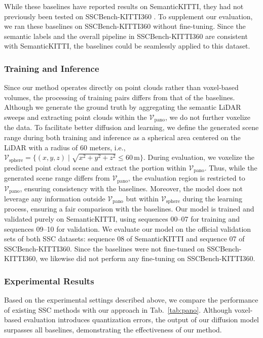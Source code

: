 \documentclass[conference]{IEEEtran}
\begin{document}
While these baselines have reported results on SemanticKITTI, they had not previously been tested on SSCBench-KITTI360 \cite{vzyrianov2024}.
To supplement our evaluation, we ran these baselines on SSCBench-KITTI360 without fine-tuning.
Since the semantic labels and the overall pipeline in SSCBench-KITTI360 are consistent with SemanticKITTI, the baselines could be seamlessly applied to this dataset.

\subsubsection{Training and Inference}

Since our method operates directly on point clouds rather than voxel-based volumes, the processing of training pairs differs from that of the baselines.
Although we generate the ground truth by aggregating the semantic LiDAR sweeps and extracting point clouds within the $\mathcal{V}_\mathrm{pano}$, we do not further voxelize the data.
To facilitate better diffusion and learning, we define the generated scene range during both training and inference as a spherical area centered on the LiDAR with a radius of 60 meters, i.e.,
$\mathcal{V}_\mathrm{sphere} = \{(x,y,z) \mid \sqrt{x^2+y^2+z^2} \leq 60\,\text{m}\}$.
During evaluation, we voxelize the predicted point cloud scene and extract the portion within $\mathcal{V}_\mathrm{pano}$.
Thus, while the generated scene range differs from $\mathcal{V}_\mathrm{pano}$, the evaluation region is restricted to $\mathcal{V}_\mathrm{pano}$, ensuring consistency with the baselines.
Moreover, the model does not leverage any information outside $\mathcal{V}_\mathrm{pano}$ but within $\mathcal{V}_\mathrm{sphere}$ during the learning process, ensuring a fair comparison with the baselines.
Our model is trained and validated purely on SemanticKITTI, using sequences 00--07 for training and sequences 09--10 for validation.
We evaluate our model on the official validation sets of both SSC datasets: sequence 08 of SemanticKITTI and sequence 07 of SSCBench-KITTI360.
Since the baselines were not fine-tuned on SSCBench-KITTI360, we likewise did not perform any fine-tuning on SSCBench-KITTI360.

\subsubsection{Experimental Results}

Based on the experimental settings described above, we compare the performance of existing SSC methods with our approach in Tab.~\ref{tab:pano}.
Although voxel-based evaluation introduces quantization errors, the output of our diffusion model surpasses all baselines, demonstrating the effectiveness of our method.
\end{document}
